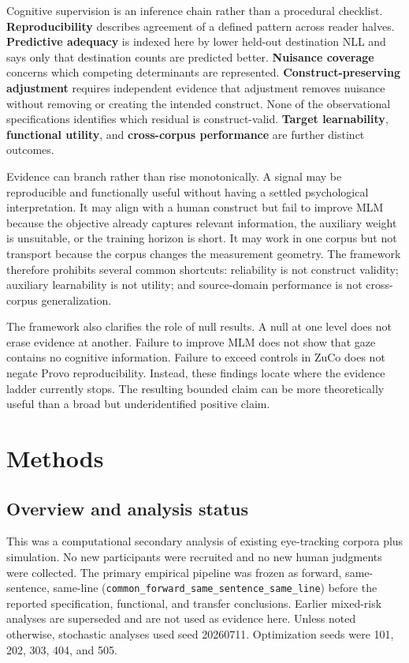 \documentclass[11pt]{article}
\begin{document}
Cognitive supervision is an inference chain rather than a procedural checklist. \textbf{Reproducibility} describes agreement of a defined pattern across reader halves. \textbf{Predictive adequacy} is indexed here by lower held-out destination NLL and says only that destination counts are predicted better. \textbf{Nuisance coverage} concerns which competing determinants are represented. \textbf{Construct-preserving adjustment} requires independent evidence that adjustment removes nuisance without removing or creating the intended construct. None of the observational specifications identifies which residual is construct-valid. \textbf{Target learnability}, \textbf{functional utility}, and \textbf{cross-corpus performance} are further distinct outcomes.

Evidence can branch rather than rise monotonically. A signal may be reproducible and functionally useful without having a settled psychological interpretation. It may align with a human construct but fail to improve MLM because the objective already captures relevant information, the auxiliary weight is unsuitable, or the training horizon is short. It may work in one corpus but not transport because the corpus changes the measurement geometry. The framework therefore prohibits several common shortcuts: reliability is not construct validity; auxiliary learnability is not utility; and source-domain performance is not cross-corpus generalization.

The framework also clarifies the role of null results. A null at one level does not erase evidence at another. Failure to improve MLM does not show that gaze contains no cognitive information. Failure to exceed controls in ZuCo does not negate Provo reproducibility. Instead, these findings locate where the evidence ladder currently stops. The resulting bounded claim can be more theoretically useful than a broad but underidentified positive claim.

\section{Methods}

\subsection{Overview and analysis status}

This was a computational secondary analysis of existing eye-tracking corpora plus simulation. No new participants were recruited and no new human judgments were collected. The primary empirical pipeline was frozen as forward, same-sentence, same-line (\texttt{common\_forward\_same\_sentence\_same\_line}) before the reported specification, functional, and transfer conclusions. Earlier mixed-risk analyses are superseded and are not used as evidence here. Unless noted otherwise, stochastic analyses used seed 20260711. Optimization seeds were 101, 202, 303, 404, and 505.
\end{document}

